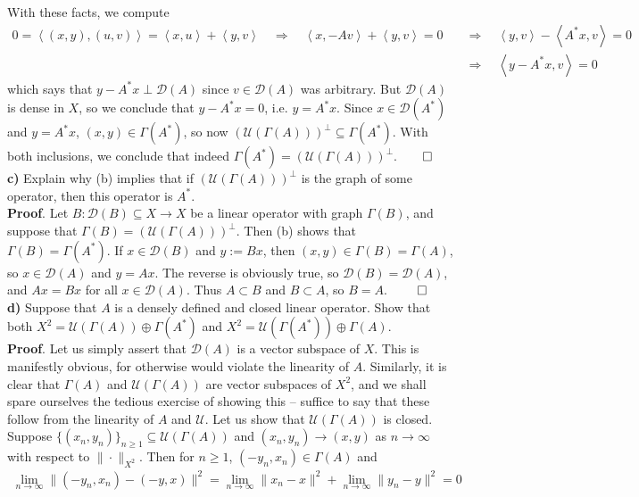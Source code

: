 \documentclass[10pt]{article}
\newcommand{\1}[1]{\mathbbm{1}_{#1}} \newcommand{\mc}[1]{\mathcal{#1}}
\newcommand{\ip}[2]{\left\langle#1,#2\right\rangle }
\begin{document}
    With these facts, we compute
    \begin{align*}
        0=\ip{(x,y)}{(u,v)}=\ip{x}{u}+\ip{y}{v}\quad\Rightarrow\quad \ip{x}{-Av}+\ip{y}{v}=0\quad&\Rightarrow\quad \ip{y}{v}-\ip{A^\ast x}{v}=0\tag{3}\\
        &\Rightarrow\quad \ip{y-A^\ast x}{v}=0
    \end{align*}
    which says that $y-A^\ast x\perp\mc{D}(A)$ since $v\in\mc{D}(A)$ was arbitrary. But $\mc{D}(A)$ is dense in $X$, so we conclude that $y-A^\ast x=0$, i.e. $y=A^\ast x$. Since $x\in\mc{D}(A^\ast)$ and $y=A^\ast x$, $(x,y)\in\Gamma(A^\ast)$,
    so now $(\mc{U}(\Gamma(A)))^\perp\subseteq\Gamma(A^\ast)$. With both inclusions, we conclude that indeed $\Gamma(A^\ast)=(\mc{U}(\Gamma(A)))^\perp$.\hfill{$\qed$}\\[5pt]
    {\bf c)} Explain why (b) implies that if $(\mc{U}(\Gamma(A)))^\perp$ is the graph of some operator, then this operator is $A^\ast$.\\[5pt]
    {\bf Proof}. Let $B:\mc{D}(B)\subseteq X\rightarrow X$ be a linear operator with graph $\Gamma(B)$, and suppose that $\Gamma(B)=(\mc{U}(\Gamma(A)))^\perp$. Then (b) shows that $\Gamma(B)=\Gamma(A^\ast)$. If $x\in\mc{D}(B)$ and $y:=Bx$, then $(x,y)\in\Gamma(B)=\Gamma(A)$,
    so $x\in\mc{D}(A)$ and $y=Ax$. The reverse is obviously true, so $\mc{D}(B)=\mc{D}(A)$, and $Ax=Bx$ for all $x\in\mc{D}(A)$. Thus $A\subset B$ and $B\subset A$, so $B=A$. \hfill{$\qed$}\\[5pt]
    {\bf d)} Suppose that $A$ is a densely defined and closed linear operator. Show that both $X^2=\mc{U}(\Gamma(A))\oplus\Gamma(A^\ast)$ and $X^2=\mc{U}(\Gamma(A^\ast))\oplus\Gamma(A)$.\\[5pt]
    {\bf Proof}. Let us simply assert that $\mc{D}(A)$ is a vector subspace of $X$. This is manifestly obvious, for otherwise would violate the linearity of $A$. Similarly, it is clear that $\Gamma(A)$ and $\mc{U}(\Gamma(A))$ are vector subspaces of $X^2$, and
    we shall spare ourselves the tedious exercise of showing this -- suffice to say that these follow from the linearity of $A$ and $\mc{U}$. Let us show that $\mc{U}(\Gamma(A))$ is closed. Suppose $\{(x_n,y_n)\}_{n\geq 1}\subseteq\mc{U}(\Gamma(A))$
    and $(x_n,y_n)\rightarrow(x,y)$ as $n\rightarrow\infty$ with respect to $\|\cdot\|_{X^2}$. Then for $n\geq 1$, $(-y_n,x_n)\in\Gamma(A)$ and
    \begin{align*}
        \lim_{n\rightarrow\infty}\|(-y_n,x_n)-(-y,x)\|^2=\lim_{n\rightarrow\infty}\|x_n-x\|^2+\lim_{n \rightarrow\infty}\|y_n-y\|^2=0
    \end{align*}
\end{document}
